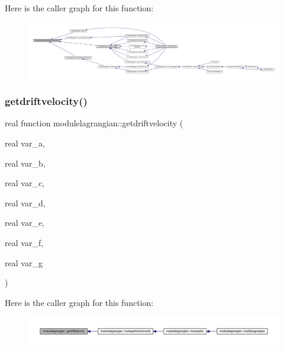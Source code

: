 Here is the caller graph for this function\+:\nopagebreak
\begin{figure}[H]
\begin{center}
\leavevmode
\includegraphics[width=350pt]{namespacemodulelagrangian_a379f0c8ed7aad4570a94ad678e1dea6e_icgraph}
\end{center}
\end{figure}
\mbox{\label{namespacemodulelagrangian_a4fe5e7ff4efbd8464e9c64ac12f53a3c}} 
\subsubsection{\texorpdfstring{getdriftvelocity()}{getdriftvelocity()}}
{\footnotesize\ttfamily real function modulelagrangian\+::getdriftvelocity (\begin{DoxyParamCaption}\item[{real}]{var\+\_\+a,  }\item[{real}]{var\+\_\+b,  }\item[{real}]{var\+\_\+c,  }\item[{real}]{var\+\_\+d,  }\item[{real}]{var\+\_\+e,  }\item[{real}]{var\+\_\+f,  }\item[{real}]{var\+\_\+g }\end{DoxyParamCaption})\hspace{0.3cm}{\ttfamily [private]}}

Here is the caller graph for this function\+:\nopagebreak
\begin{figure}[H]
\begin{center}
\leavevmode
\includegraphics[width=350pt]{namespacemodulelagrangian_a4fe5e7ff4efbd8464e9c64ac12f53a3c_icgraph}
\end{center}
\end{figure}
\mbox{\label{namespacemodulelagrangian_acfabdebec80bc9e9353be9b171fdbbdb}} 
